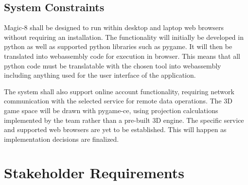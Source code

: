 \documentclass[12pt]{article}
\begin{document}
\subsection{System Constraints}



Magic-8 shall be designed to run within desktop and laptop web browsers without requiring an installation.
The functionality will initially be developed in python as well as supported python libraries such as pygame.
It will then be translated into webassembly code for execution in browser. This means that all python code must be
translatable with the chosen tool into webassembly including anything used for the user interface of the application.

The system shall also support online account functionality, requiring network communication with the selected 
service for remote data operations. The 3D game space will be drawn with pygame-ce, using projection calculations implemented
by the team rather than a pre-built 3D engine. The specific service and supported web browsers are yet to be established.
This will happen as implementation decisions are finalized.

\section{Stakeholder Requirements}
\end{document}
